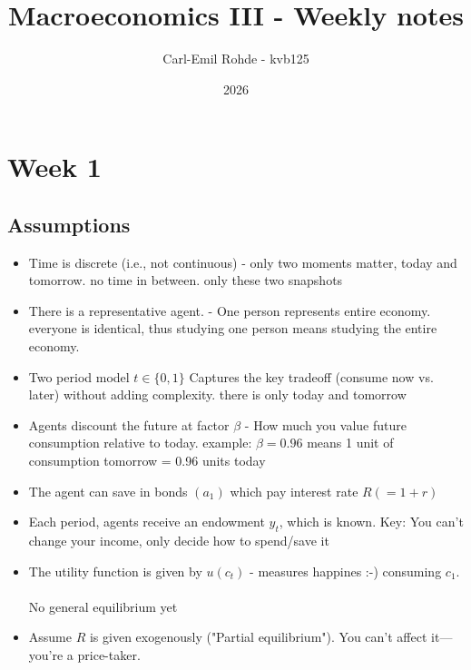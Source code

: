 \documentclass[12pt]{article}
\title{Macroeconomics III - Weekly notes}
\author{Carl-Emil Rohde - kvb125}
\date{2026}
\begin{document}
\maketitle

\section{Week 1}

\subsection{Assumptions}
\begin{itemize}
    \item Time is discrete (i.e., not continuous) - only two moments matter, today and tomorrow. no time in between. only these two snapshots
    \item There is a representative agent. - One person represents entire economy. everyone is identical, thus studying one person means studying the entire economy. 
    \item Two period model $t \in\{0,1\}$ Captures the key tradeoff (consume now vs. later) without adding complexity. there is only today and tomorrow
    \item Agents discount the future at factor $\beta$ - How much you value future consumption relative to today. example: $\beta = 0.96$ means 1 unit of consumption tomorrow = 0.96 units today
    \item The agent can save in bonds $\left(a_1\right)$ which pay interest rate $R(=1+r)$
    \item Each period, agents receive an endowment $y_t$, which is known. Key: You can't change your income, only decide how to spend/save it
    \item The utility function is given by $u\left(c_t\right)$ - measures happines :-) consuming $c_1$.
    \\
    \\
No general equilibrium yet
    \item Assume $R$ is given exogenously ("Partial equilibrium"). You can't affect it—you're a price-taker.
\end{itemize}
\newpage
\end{document}
